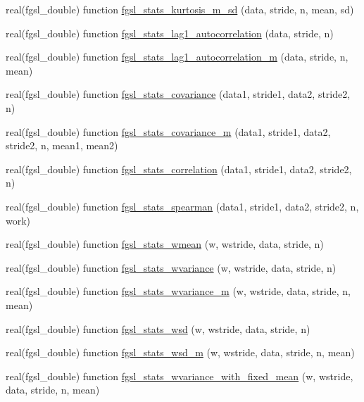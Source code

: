 \begin{DoxyCompactItemize}
\item 
real(fgsl\+\_\+double) function \hyperlink{statistics_8finc_a73f37fa7fc26bbc32b2ec4f430ff4237}{fgsl\+\_\+stats\+\_\+kurtosis\+\_\+m\+\_\+sd} (data, stride, n, mean, sd)
\item 
real(fgsl\+\_\+double) function \hyperlink{statistics_8finc_aec9e1868404363cdd4071d759452dffa}{fgsl\+\_\+stats\+\_\+lag1\+\_\+autocorrelation} (data, stride, n)
\item 
real(fgsl\+\_\+double) function \hyperlink{statistics_8finc_ab2de33bfbff99ba0e1519a92ffc2a198}{fgsl\+\_\+stats\+\_\+lag1\+\_\+autocorrelation\+\_\+m} (data, stride, n, mean)
\item 
real(fgsl\+\_\+double) function \hyperlink{statistics_8finc_abe8b984e22ce9662518b3058c5ed3fc9}{fgsl\+\_\+stats\+\_\+covariance} (data1, stride1, data2, stride2, n)
\item 
real(fgsl\+\_\+double) function \hyperlink{statistics_8finc_a022a3337d746efe8ba47bb7b790978a9}{fgsl\+\_\+stats\+\_\+covariance\+\_\+m} (data1, stride1, data2, stride2, n, mean1, mean2)
\item 
real(fgsl\+\_\+double) function \hyperlink{statistics_8finc_ad641fcad25f9ad39af269073822f3700}{fgsl\+\_\+stats\+\_\+correlation} (data1, stride1, data2, stride2, n)
\item 
real(fgsl\+\_\+double) function \hyperlink{statistics_8finc_ad2978bbd93b93ac7bb5e47373546bbd6}{fgsl\+\_\+stats\+\_\+spearman} (data1, stride1, data2, stride2, n, work)
\item 
real(fgsl\+\_\+double) function \hyperlink{statistics_8finc_ac44e8f61b5d6ece8de2c7859c7324df9}{fgsl\+\_\+stats\+\_\+wmean} (w, wstride, data, stride, n)
\item 
real(fgsl\+\_\+double) function \hyperlink{statistics_8finc_a7369e6ff86c963b93045d041e0318b37}{fgsl\+\_\+stats\+\_\+wvariance} (w, wstride, data, stride, n)
\item 
real(fgsl\+\_\+double) function \hyperlink{statistics_8finc_a58b0acc505557f72f2cfc2813e945666}{fgsl\+\_\+stats\+\_\+wvariance\+\_\+m} (w, wstride, data, stride, n, mean)
\item 
real(fgsl\+\_\+double) function \hyperlink{statistics_8finc_a07bed243844c213b933de5274daa9116}{fgsl\+\_\+stats\+\_\+wsd} (w, wstride, data, stride, n)
\item 
real(fgsl\+\_\+double) function \hyperlink{statistics_8finc_a9be620d1825095d70f5a3eb93f1e8304}{fgsl\+\_\+stats\+\_\+wsd\+\_\+m} (w, wstride, data, stride, n, mean)
\item 
real(fgsl\+\_\+double) function \hyperlink{statistics_8finc_a6106f2ae69fddefef4d5e233e54a8df0}{fgsl\+\_\+stats\+\_\+wvariance\+\_\+with\+\_\+fixed\+\_\+mean} (w, wstride, data, stride, n, mean)

\end{DoxyCompactItemize}
